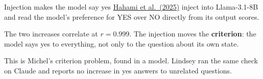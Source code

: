 \documentclass[aspectratio=169,11pt]{beamer}
\begin{document}
\begin{frame}[label=yesbias]{Injection makes the model say yes}
\href{https://arxiv.org/abs/2512.12411}{Hahami et al.\ (2025)} inject into Llama-3.1-8B and read the model's preference for YES over NO directly from its output scores.

\vspace{0.5em}
\begin{center}
\end{center}

\vspace{0.5em}
The two increases correlate at $r = 0.999$. The injection moves the \textbf{\textcolor{bias}{criterion}}: the model says yes to everything, not only to the question about its own state.

\vspace{0.3em}
{\small This is Michel's criterion problem, found in a model. Lindsey ran the same check on Claude and reports no increase in yes answers to unrelated questions.}
\end{frame}
\end{document}
